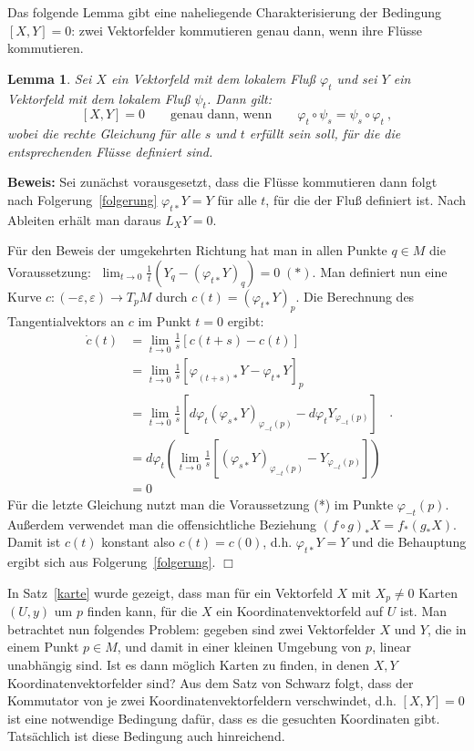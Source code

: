 \documentclass[12pt,a4paper]{article}
\newtheorem{Lemma}{Lemma}[section]
\def\proof{\noindent\textbf{Beweis:}\quad}
\def\qed{\quad\hfill\ensuremath{\Box}}
\begin{document}
\bigskip

Das folgende Lemma gibt eine naheliegende Charakterisierung der Bedingung $[X,Y]=0$:
zwei Vektorfelder kommutieren genau dann, wenn ihre Fl\"usse kommutieren.

\begin{Lemma}\label{kommutator}
Sei $X$ ein Vektorfeld mit dem lokalem Flu\ss{} $\varphi_t$ und sei $Y$ ein Vektorfeld mit
dem lokalem Flu\ss{} $\psi_t$. Dann gilt:
$$
[X, Y] = 0 \qquad \mbox{genau dann, wenn} \qquad \varphi_t \circ \psi_s = \psi_s\circ \varphi_t \ ,
$$
wobei die rechte Gleichung f\"ur alle $s$ und $t$ erf\"ullt sein soll, f\"ur die die entsprechenden
Fl\"usse definiert sind.
\end{Lemma}
\proof
Sei zun\"achst vorausgesetzt, dass die Fl\"usse kommutieren dann folgt nach Folgerung~\ref{folgerung}
$\varphi_{t*} Y = Y$ f\"ur alle $t$, f\"ur die der Flu\ss{} definiert ist. Nach Ableiten erh\"alt man
daraus $L_XY=0$.

\medskip

F\"ur den Beweis der umgekehrten Richtung hat man in allen Punkte $q\in M$ die Voraussetzung:
$\;\lim_{t\rightarrow 0} \frac1t(Y_q - (\varphi_{t*}Y)_q) = 0 \; (\ast)$. Man definiert nun eine Kurve
$c : (-\varepsilon, \varepsilon)\rightarrow T_pM$ durch $c(t) = (\varphi_{t*}Y)_p$.
Die Berechnung des Tangentialvektors an $c$ im Punkt $t=0$ ergibt:
$$
\begin{array}{rl}
\dot c(t) & = \lim_{t\rightarrow 0} \frac1s [c(t+s)-c(t)]\\[1ex]
& = \lim_{t\rightarrow 0} \frac1s [\varphi_{(t+s)*}Y - \varphi_{t*}Y]_p\\[1ex]
& = \lim_{t\rightarrow 0} \frac1s [d\varphi_t (\varphi_{s*}Y)_{\varphi_{-t}(p)} -  d\varphi_t Y_{\varphi_{-t}(p)}]\\[1ex]
& = d\varphi_t \left(  \lim_{t\rightarrow 0} \frac1s   [(\varphi_{s*}Y)_{\varphi_{-t}(p)} - Y_{\varphi_{-t}(p)} ]\right)\\[1ex]
& = 0
\end{array} \ .
$$
F\"ur die letzte Gleichung nutzt man die Voraussetzung (*) im Punkte $\varphi_{-t}(p)$. Au\ss erdem
verwendet man die offensichtliche Beziehung $(f\circ g)_* X = f_* (g_*X)$. Damit ist $c(t)$
konstant also $c(t) = c(0)$, d.h. $\varphi_{t\ast}Y = Y$ und die Behauptung ergibt sich aus
Folgerung~\ref{folgerung}.
\qed

\bigskip

In Satz~\ref{karte} wurde gezeigt, dass man f\"ur ein Vektorfeld $X$ mit $X_p\neq 0$
Karten $(U,y)$ um $p$ finden kann, f\"ur die $X$ ein Koordinatenvektorfeld auf $U$ ist.
Man betrachtet nun folgendes Problem: gegeben sind zwei Vektorfelder $X$ und $Y$, die in
einem Punkt $p\in M$, und damit in einer kleinen Umgebung von $p$, linear unabh\"angig sind.
Ist es dann m\"oglich Karten zu finden, in denen $X, Y$ Koordinatenvektorfelder sind?
Aus dem Satz von Schwarz folgt, dass der Kommutator von je zwei Koordinatenvektorfeldern
verschwindet, d.h. $[X,Y]=0$ ist eine notwendige Bedingung daf\"ur, dass es die gesuchten Koordinaten gibt.
Tats\"achlich ist diese Bedingung auch hinreichend.
\end{document}
